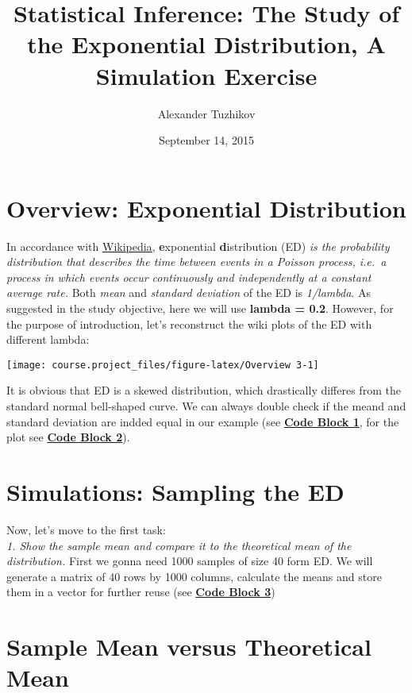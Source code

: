 \documentclass[]{article}
\title{Statistical Inference: The Study of the Exponential Distribution, A
Simulation Exercise}
\author{Alexander Tuzhikov}
\date{September 14, 2015}
\begin{document}
\maketitle

\section{Overview: Exponential
Distribution}\label{overview-exponential-distribution}

In accordance with
\href{https://en.wikipedia.org/wiki/Exponential_distribution}{Wikipedia},
\textbf{e}xponential \textbf{d}istribution (ED) \emph{is the probability
distribution that describes the time between events in a Poisson
process, i.e.~a process in which events occur continuously and
independently at a constant average rate.} Both \emph{mean} and
\emph{standard deviation} of the ED is \emph{1/lambda}. As suggested in
the study objective, here we will use \textbf{lambda = 0.2}. However,
for the purpose of introduction, let's reconstruct the wiki plots of the
ED with different lambda:

\begin{center}\texttt{[image: course.project\_files/figure-latex/Overview 3-1]} \end{center}

It is obvious that ED is a skewed distribution, which drastically
differes from the standard normal bell-shaped curve. We can always
double check if the meand and standard deviation are indded equal in our
example (see \textbf{\hyperref[code-block-1]{Code Block 1}}, for the
plot see \textbf{\hyperref[code-block-2]{Code Block 2}}).

\section{Simulations: Sampling the
ED}\label{simulations-sampling-the-ed}

Now, let's move to the first task:\\
\emph{1. Show the sample mean and compare it to the theoretical mean of
the distribution.} First we gonna need 1000 samples of size 40 form ED.
We will generate a matrix of 40 rows by 1000 columns, calculate the
means and store them in a vector for further reuse (see
\textbf{\hyperref[code-block-3]{Code Block 3}})

\section{Sample Mean versus Theoretical
Mean}\label{sample-mean-versus-theoretical-mean}
\end{document}
